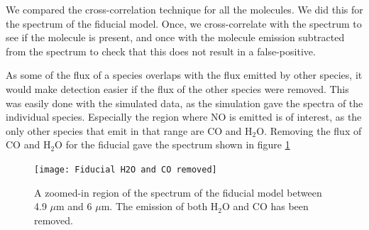 \documentclass[oneside, single, authoryear, semicolon]{lion-msc}
\newcommand{\4}{$_4$}
\newcommand{\3}{$_3$}
\newcommand{\2}{$_2$}
\begin{document}
We compared the cross-correlation technique for all the molecules. We did this for the spectrum of the fiducial model. Once, we cross-correlate with the spectrum to see if the molecule is present, and once with the molecule emission subtracted from the spectrum to check that this does not result in a false-positive.








As some of the flux of a species overlaps with the flux emitted by other species, it would make detection easier if the flux of the other species were removed. This was easily done with the simulated data, as the simulation gave the spectra of the individual species. Especially the region where NO is emitted is of interest, as the only other species that emit in that range are CO and H\2O. Removing the flux of CO and H\2O for the fiducial gave the spectrum shown in figure \ref{fig: H2O and CO removed}

\begin{figure}
    \centering
    \texttt{[image: Fiducial H2O and CO removed]}
    \caption{A zoomed-in region of the spectrum of the fiducial model between 4.9 $\mu$m and 6 $\mu$m. The emission of both H\2O and CO has been removed.}
    \label{fig: H2O and CO removed}
\end{figure}
\end{document}

